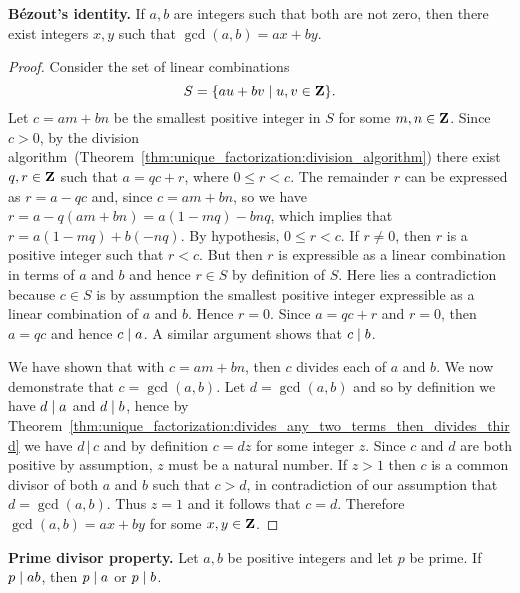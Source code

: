 \begin{theorem}
\label{thm:unique_factorization:Bezout's_identity}
\textbf{B\'ezout's identity.}
If $a,b$ are integers such that both are not zero, then there exist
integers $x,y$ such that $\gcd(a,b) = ax + by$.
\end{theorem}

\begin{proof}
Consider the set of linear combinations
\[
S
=
\{au + bv \;|\; u,v \in \mathbf{Z}\}.
\]
Let $c = am + bn$ be the smallest positive integer in $S$ for
some $m,n \in \mathbf{Z}$. Since $c > 0$, by the division
algorithm~(Theorem~\ref{thm:unique_factorization:division_algorithm})
there exist $q,r \in \mathbf{Z}$ such that $a = qc + r$, where
$0 \leq r < c$. The remainder $r$ can be expressed as $r = a - qc$
and, since $c = am + bn$, so we have $r = a - q(am+bn) = a(1-mq) - bnq$,
which implies that $r = a(1-mq) + b(-nq)$. By hypothesis, $0 \leq r < c$.
If $r \neq 0$, then $r$ is a positive integer such that $r < c$. But
then $r$ is expressible as a linear combination in terms of $a$ and
$b$ and hence $r \in S$ by definition of $S$. Here lies a
contradiction because $c \in S$ is by assumption the smallest positive
integer expressible as a linear combination of $a$ and $b$. Hence
$r = 0$. Since $a = qc + r$ and $r = 0$, then $a = qc$ and hence
$c \;|\; a$. A similar argument shows that $c \;|\; b$.

We have shown that with $c = am + bn$, then $c$ divides each of $a$
and $b$. We now demonstrate that $c = \gcd(a,b)$. Let $d = \gcd(a,b)$
and so by definition we have $d \;|\; a$ and $d \;|\; b$, hence
by
Theorem~\ref{thm:unique_factorization:divides_any_two_terms_then_divides_third}
we have $d \,|\, c$ and by definition $c = dz$ for some integer
$z$. Since $c$ and $d$ are both positive by
assumption, $z$ must be a natural number. If $z > 1$ then $c$ is a
common divisor of both $a$ and $b$ such that $c > d$, in
contradiction of our assumption that $d = \gcd(a,b)$. Thus $z = 1$
and it follows that $c = d$. Therefore $\gcd(a,b) = ax + by$ for
some $x,y \in \mathbf{Z}$.
\end{proof}

\begin{corollary}
\label{cor:unique_factorization:prime_divisor_property}
\textbf{Prime divisor property.}
Let $a,b$ be positive integers and let $p$ be prime. If $p \;|\; ab$,
then $p \;|\; a$ or $p \;|\; b$.
\end{corollary}

